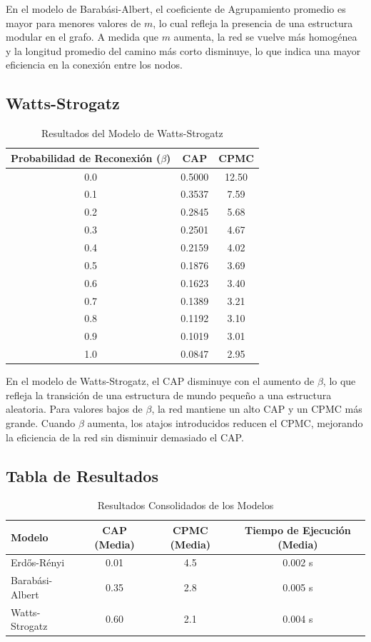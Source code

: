 \documentclass[12pt]{book}
\begin{document}
En el modelo de Barabási-Albert, el coeficiente de Agrupamiento promedio es mayor para menores valores de $m$, lo cual refleja la presencia de una estructura modular en el grafo. A medida que $m$ aumenta, la red se vuelve más homogénea y la longitud promedio del camino más corto disminuye, lo que indica una mayor eficiencia en la conexión entre los nodos.

\subsection{Watts-Strogatz}

\begin{table}[h!]
\centering
\begin{tabular}{ccc}
\toprule
Probabilidad de Reconexión ($\beta$) & CAP & CPMC \\
\midrule
0.0 & 0.5000 & 12.50 \\
0.1 & 0.3537 & 7.59 \\
0.2 & 0.2845 & 5.68 \\
0.3 & 0.2501 & 4.67 \\
0.4 & 0.2159 & 4.02 \\
0.5 & 0.1876 & 3.69 \\
0.6 & 0.1623 & 3.40 \\
0.7 & 0.1389 & 3.21 \\
0.8 & 0.1192 & 3.10 \\
0.9 & 0.1019 & 3.01 \\
1.0 & 0.0847 & 2.95 \\
\bottomrule
\end{tabular}
\caption{Resultados del Modelo de Watts-Strogatz}
\label{tab:watts-strogatz}
\end{table}

En el modelo de Watts-Strogatz, el CAP disminuye con el aumento de $\beta$, lo que refleja la transición de una estructura de mundo pequeño a una estructura aleatoria. Para valores bajos de $\beta$, la red mantiene un alto CAP y un CPMC más grande. Cuando $\beta$ aumenta, los atajos introducidos reducen el CPMC, mejorando la eficiencia de la red sin disminuir demasiado el CAP.

\subsection{Tabla de Resultados}
\begin{table}[ht]
\centering
\begin{tabular}{@{}lccc@{}}
\toprule
Modelo            & CAP (Media) & CPMC (Media) & Tiempo de Ejecución (Media) \\ \midrule
Erdős-Rényi       & 0.01        & 4.5          & 0.002 s                     \\
Barabási-Albert   & 0.35        & 2.8          & 0.005 s                     \\
Watts-Strogatz    & 0.60        & 2.1          & 0.004 s                     \\ \bottomrule
\end{tabular}
\caption{Resultados Consolidados de los Modelos}
\end{table}
\end{document}
